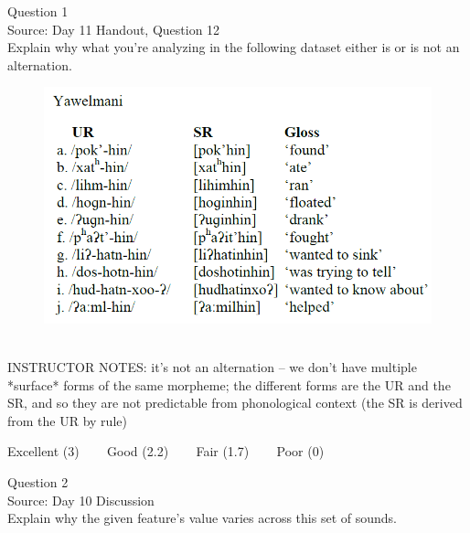 \documentclass[12pt]{article}
\begin{document}
\begin{center}
\textbf{{\color{blue}{\HUGE START OF EXAM\\}}}

\textbf{{\color{blue}{\HUGE Student ID: 7336\\}}}

\textbf{{\color{blue}{\HUGE 9:50 - 10:10 AM\\}}}

\end{center}
\newpage

{\large Question 1}\\

Source: Day 11 Handout, Question 12\\

Explain why what you’re analyzing in the following dataset either is or is not an alternation.\\

\begin{figure}[H]
\includegraphics{../images/yawelmani.png}
\end{figure}

~\\
INSTRUCTOR NOTES: it's not an alternation -- we don't have multiple *surface* forms of the same morpheme; the different forms are the UR and the SR, and so they are not predictable from phonological context (the SR is derived from the UR by rule)


\vfill
Excellent (3) ~~~ Good (2.2) ~~~ Fair (1.7) ~~~ Poor (0)
\newpage

{\large Question 2}\\

Source: Day 10 Discussion\\

Explain why the given feature's value varies across this set of sounds.\\
\end{document}
